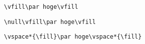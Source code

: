 \documentclass[paper=a7paper,landscape]{jlreq}
\begin{document}
\vfill\par\verb:\vfill\par hoge\vfill:\vfill\pagebreak
\null\vfill\par\verb:\null\vfill\par hoge\vfill:\vfill\pagebreak
\vspace*{\fill}\par\verb:\vspace*{\fill}\par hoge\vspace*{\fill}:\vspace*{\fill}\pagebreak
\end{document}
